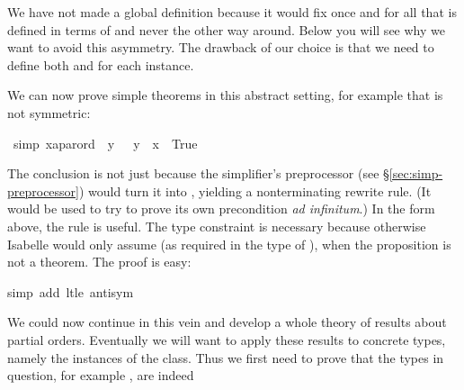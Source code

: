 \begin{isabellebody}
\begin{isamarkuptext}
We have not made  a global definition because it would
fix once and for all that \isa{{\isacharless}{\isacharless}} is defined in terms of \isa{{\isacharless}{\isacharless}{\isacharequal}} and
never the other way around. Below you will see why we want to avoid this
asymmetry. The drawback of our choice is that
we need to define both \isa{{\isacharless}{\isacharless}{\isacharequal}} and \isa{{\isacharless}{\isacharless}} for each instance.

We can now prove simple theorems in this abstract setting, for example
that \isa{{\isacharless}{\isacharless}} is not symmetric:%
\end{isamarkuptext}%
\isamarkuptrue%
\isamarkupfalse%
\ {\isacharbrackleft}simp{\isacharbrackright}{\isacharcolon}\ {\isachardoublequoteopen}{\isacharparenleft}x{\isacharcolon}{\isacharcolon}{\isacharprime}a{\isacharcolon}{\isacharcolon}parord{\isacharparenright}\ {\isacharless}{\isacharless}\ y\ {\isasymLongrightarrow}\ {\isacharparenleft}{\isasymnot}\ y\ {\isacharless}{\isacharless}\ x{\isacharparenright}\ {\isacharequal}\ True{\isachardoublequoteclose}%
\isadelimproof
%
\endisadelimproof
%
\isatagproof
%
\begin{isamarkuptxt}%
\noindent
The conclusion is not just  because the 
simplifier's preprocessor (see \S\ref{sec:simp-preprocessor})
would turn it into , yielding
a nonterminating rewrite rule.  
(It would be used to try to prove its own precondition \emph{ad
    infinitum}.)
In the form above, the rule is useful.
The type constraint is necessary because otherwise Isabelle would only assume
 (as required in the type of \isa{{\isacharless}{\isacharless}}), 
when the proposition is not a theorem.  The proof is easy:%
\end{isamarkuptxt}%
\isamarkuptrue%
\isamarkupfalse%
{\isacharparenleft}simp\ add{\isacharcolon}\ lt{\isacharunderscore}le\ antisym{\isacharparenright}%
\endisatagproof
{\isafoldproof}%
%
\isadelimproof
%
\endisadelimproof
%
\begin{isamarkuptext}%
We could now continue in this vein and develop a whole theory of
results about partial orders. Eventually we will want to apply these results
to concrete types, namely the instances of the class. Thus we first need to
prove that the types in question, for example , are indeed

\end{isamarkuptext}
\end{isabellebody}

